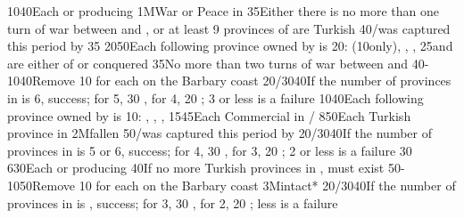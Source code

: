 {10}{40}{Each \COL or \TP producing \POSPICE}%
%
%
\EUobjective1M{War or Peace in \payshongrie}{}%
{}{35}{Either there is no more than one turn of war between \AUSaus and \TUR,
  or at least 9 provinces of \payshongrie are Turkish}%
%
%
{}{40}{\provinceOsterreich/\villeVienne was captured this period by \TUR}%
%
%
{}{35}{}%
%
%
{20}{50}{Each following province owned by \TUR is 20\VPs: \provinceCyclades
  (10\VPs only), \provinceKreta, \provinceMalta, \provinceChypre}%
%
%
{}{25}{\paysvalachie and \paysmoldavie are either \VASSAL of \TUR or
  conquered}%
%
%
%
{}{35}{No more than two turns of war between \AUSaus and \TUR}%
%
%
{40-10}{40}{Remove 10 \VPs for each \Presidio on the Barbary coast}%
%
%
{20/30}{40}{If the number of provinces in \payscrimee is 6, success; for 5, 30
  \VPs, for 4, 20 \VPs; 3 or less is a failure}%
%
%
{10}{40}{Each following province owned by \TUR is 10\VPs: \provinceCorfou,
  \provinceKreta, \provinceMalta, \provinceChypre}%
%
%
{15}{45}{Each Commercial  in \CTZ/\STZ}
%
%
%
{8}{50}{Each Turkish province in \payshongrie}%
%
\EUobjective2M{\villeVienne fallen}{}%
{}{50}{\provinceOsterreich/\villeVienne was captured this period by \TUR}%
%
%
{20/30}{40}{If the number of provinces in \payscrimee is 5 or 6, success; for
  4, 30 \VPs, for 3, 20 \VPs; 2 or less is a failure}%
%
%
{}{30}{}%
%
%
{6}{30}{Each \COL or \TP producing \POSPICE}%
%
%
%
%
{}{40}{If no more Turkish provinces in \payshongrie, \paystransylvanie must
  exist}%
%
%
%
{50-10}{50}{Remove 10 \VPs for each \Presidio on the Barbary coast}%
%
\EUobjective3M{\payscrimee intact*}{}%
{20/30}{40}{If the number of provinces in \payscrimee is , success; for
  3, 30 \VPs, for 2, 20 \VPs; less is a failure}%
%
